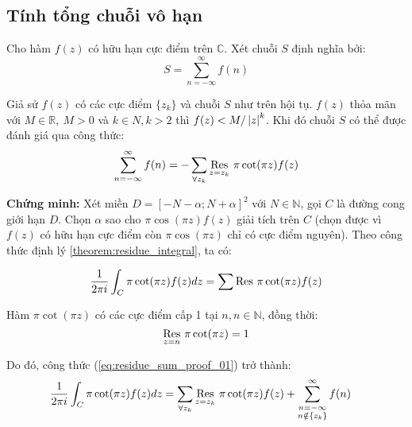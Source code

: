 \subsection{Tính tổng chuỗi vô hạn}%
\label{sub:tính_tổng_chuỗi_vô_hạn}

Cho hàm $f(z)$ có hữu hạn cực điểm trên $\mathbb C$. Xét chuỗi $S$ định nghĩa bởi:
\begin{equation}
	\label{eq:infsum_sum}
	S = \sum_{n = -\infty}^{\infty} f(n)
\end{equation}

\begin{theorem}
	\label{theorem:residue_sum}
Giả sử $f(z)$ có các cực điểm $\{z_k\}$ và chuỗi $S$ như trên hội tụ. $f(z)$ thỏa mãn với $M\in \mathbb R,\ M > 0$ và $k \in N, k > 2$ thì $f(z) < M/\abs{z}^k$. Khi đó chuỗi $S$ có thể được đánh giá qua công thức:
	\begin{equation*}
		\sum_{n = -\infty}^{\infty} f(n) = - \sum_{\forall z_k} \Res{\pi \cot(\pi z)f(z)}{z=z_k}
	\end{equation*}
\end{theorem}

\textbf{Chứng minh:} Xét miền $D = [-N-\alpha; N + \alpha]^2$ với $N \in \mathbb N$, gọi $C$ là đường cong giới hạn $D$. Chọn $\alpha$ sao cho $\pi\cos(\pi z)f(z)$ giải tích trên $C$ (chọn được vì $f(z)$ có hữu hạn cực điểm còn $\pi\cos(\pi z)$ chỉ có cực điểm nguyên). Theo công thức định lý \ref{theorem:residue_integral}, ta có:



\begin{equation}
	\label{eq:residue_sum_proof_01}
	\frac{1}{2\pi i}\int_C \pi \cot(\pi z)f(z) dz = \sum \Res{\pi \cot(\pi z) f(z)}{}
\end{equation}

Hàm $\pi \cot(\pi z)$ có các cực điểm cấp 1 tại $n, n\in\mathbb N$, đồng thời:
\begin{equation}
	\label{eq:residue_sum_proof_02}
	\Res{\pi\cot(\pi z)}{z=n} = 1
\end{equation}

Do đó, công thức (\ref{eq:residue_sum_proof_01}) trở thành:
\begin{align}
	\label{eq:residue_sum_proof_03}
	\frac{1}{2\pi i}\int_C \pi \cot(\pi z)f(z) dz &= \sum_{\forall z_k} \Res{\pi \cot(\pi z) f(z)}{z=z_k} + \sum_{\substack{n = -\infty\\n\notin \{z_k\}}}^{\infty} f(n)
\end{align}

